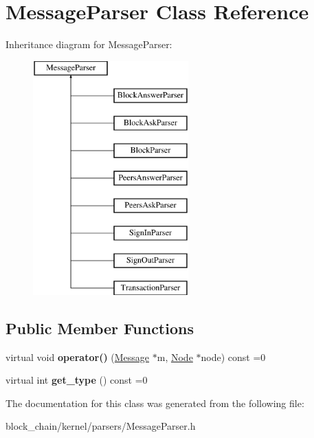 \hypertarget{classMessageParser}{}\section{Message\+Parser Class Reference}
\label{classMessageParser}
Inheritance diagram for Message\+Parser\+:\begin{figure}[H]
\begin{center}
\leavevmode
\includegraphics[height=9.000000cm]{classMessageParser}
\end{center}
\end{figure}
\subsection*{Public Member Functions}
\begin{DoxyCompactItemize}
\item 
\mbox{\label{classMessageParser_a946f3b936dc01a75d6165329b159ecfe}} 
virtual void {\bfseries operator()} (\mbox{\hyperlink{classMessage}{Message}} $\ast$m, \mbox{\hyperlink{classNode}{Node}} $\ast$node) const =0
\item 
\mbox{\label{classMessageParser_aa7c495d7b28a394e5752ca25ffff69d8}} 
virtual int {\bfseries get\+\_\+type} () const =0
\end{DoxyCompactItemize}


The documentation for this class was generated from the following file\+:\begin{DoxyCompactItemize}
\item 
block\+\_\+chain/kernel/parsers/Message\+Parser.\+h\end{DoxyCompactItemize}
